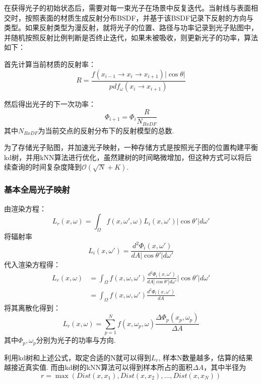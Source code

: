 \documentclass[12pt]{article}
\begin{document}
在获得光子的初始状态后，需要对每一束光子在场景中反复迭代。当射线与表面相交时，按照表面的材质生成反射分布BSDF，并基于该BSDF记录下反射的方向与类型。如果反射类型为漫反射，就将光子的位置、路径与功率记录到光子贴图中，并随机按照反射比例判断是否终止迭代，如果未被吸收，则更新光子的功率，算法如下：

首先计算当前材质的反射率：
\begin{equation}
    R=\frac{f(x_{i-1}\rightarrow x_i \rightarrow x_{i+1})|\cos \theta|}{pdf_\omega (x_i \rightarrow x_{i+1})}
\end{equation}

然后得出光子的下一次功率：
\begin{equation}
    \Phi_{i+1}=\Phi_i \frac{R}{N_{BxDF}}
\end{equation}
其中$N_{BxDF}$为当前交点的反射分布下的反射模型的总数.

为了存储光子贴图，并加速光子映射，一种存储方式是按照光子图的位置构建平衡kd树，并用kNN算法进行优化，虽然建树的时间略微增加，但这种方式可以将后续查询的时间复杂度降到$\mathcal{O}(\sqrt{N}+K)$.

\subsubsection{基本全局光子映射}

由渲染方程：
\begin{equation}
    L_r(x,\omega)=\int_\Omega f(x,\omega',\omega)L_i(x,\omega')|\cos \theta'|d\omega'
\end{equation}
将辐射率
\begin{equation}
    L_i(x,\omega')=\frac{d^2 \Phi_i(x,\omega')}{dA|\cos \theta'|d\omega'}
\end{equation}
代入渲染方程得：
\begin{align}
    L_r(x,\omega)&=\int_\Omega f(x,\omega,\omega')\frac{d^2 \Phi_i(x,\omega')}{dA|\cos \theta'|d\omega'}|\cos \theta'|d\omega'\\
    &=\int _\Omega f(x,\omega,\omega')\frac{d^2\Phi_i(x,\omega')}{dA}
\end{align}
将其离散化得到：
\begin{equation}
    L_r(x,\omega)=\sum_{p=1}^{N}f(x,\omega_p,\omega)\frac{\Delta \Phi_p(x_p,\omega_p)}{\Delta A}
\end{equation}
其中$\Phi_p,\omega_p$分别为光子的功率与方向.

利用kd树和上述公式，取定合适的N就可以得到$L_r$, 样本N数量越多，估算的结果越接近真实值. 而由kd树的kNN算法可以得到样本所占的面积$\Delta A$，其中半径为
\begin{equation}
    r=\max(Dist(x,x_1),Dist(x,x_2),\ldots ,Dist(x,x_N))
\end{equation}
\end{document}
